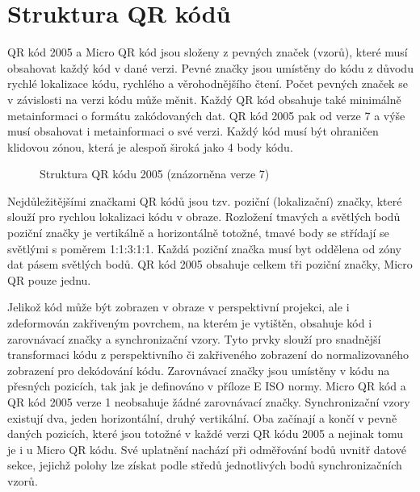 \section{Struktura QR kódů}
\label{strukturaQRKodu}

QR kód 2005 a Micro QR kód jsou složeny z pevných značek (vzorů), které musí
obsahovat každý kód v dané verzi. Pevné značky jsou umístěny do kódu z důvodu 
rychlé lokalizace kódu, rychlého a věrohodnějšího čtení. Počet pevných značek 
se v závislosti na verzi kódu může měnit. Každý QR kód obsahuje také minimálně
metainformaci o formátu zakódovaných dat. QR kód 2005 pak od verze 7 a výše 
musí obsahovat i metainformaci o své verzi. Každý kód musí být ohraničen 
klidovou zónou, která je alespoň široká jako 4 body kódu.

\begin{figure}[H]
  \begin{center}
    \caption{Struktura QR kódu 2005 (znázorněna verze 7)}
    \label{QRCodesStructure}
  \end{center}
\end{figure}

Nejdůležitějšími značkami QR kódů jsou tzv. poziční (lokalizační) značky, které 
slouží pro rychlou lokalizaci kódu v obraze. Rozložení tmavých a světlých bodů 
poziční značky je vertikálně a horizontálně totožné, tmavé body se střídají se 
světlými s poměrem 1:1:3:1:1. Každá poziční značka musí byt oddělena od zóny dat 
pásem světlých bodů. QR kód 2005 obsahuje celkem tři poziční značky, Micro QR 
pouze jednu.

Jelikož kód může být zobrazen v obraze v perspektivní projekci, ale i 
zdeformován zakřiveným povrchem, na kterém je vytištěn, obsahuje kód i 
zarovnávací značky a synchronizační vzory. Tyto prvky slouží pro snadnější 
transformaci kódu z perspektivního či zakřiveného zobrazení do normalizovaného 
zobrazení pro dekódování kódu. Zarovnávací značky jsou umístěny v kódu na 
přesných pozicích, tak jak je definováno v příloze E ISO normy. Micro QR kód 
a QR kód 2005 verze 1 neobsahuje žádné zarovnávací značky. Synchronizační vzory
existují dva, jeden horizontální, druhý vertikální. Oba začínají a končí v pevně
daných pozicích, které jsou totožné v každé verzi QR kódu 2005 a nejinak tomu 
je i u Micro QR kódu. Své uplatnění nachází při odměřování bodů uvnitř datové 
sekce, jejichž polohy lze získat podle středů jednotlivých bodů synchronizačních
vzorů. 

